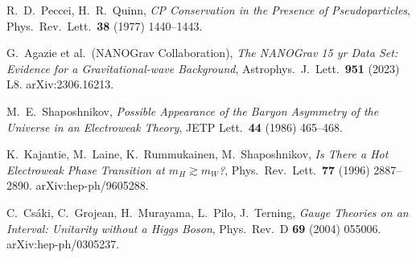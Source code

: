 \documentclass[11pt,a4paper]{article}
\theoremstyle{definition}
\theoremstyle{plain}
\theoremstyle{remark}
\begin{document}
\begin{thebibliography}{99}
R.~D.~Peccei, H.~R.~Quinn, \emph{CP Conservation in the Presence of Pseudoparticles}, Phys.\ Rev.\ Lett.\ \textbf{38} (1977) 1440--1443.

G.~Agazie et al.\ (NANOGrav Collaboration), \emph{The NANOGrav 15 yr Data Set: Evidence for a Gravitational-wave Background}, Astrophys.\ J.\ Lett.\ \textbf{951} (2023) L8. arXiv:2306.16213.

M.~E.~Shaposhnikov, \emph{Possible Appearance of the Baryon Asymmetry of the Universe in an Electroweak Theory}, JETP Lett.\ \textbf{44} (1986) 465--468.

K.~Kajantie, M.~Laine, K.~Rummukainen, M.~Shaposhnikov, \emph{Is There a Hot Electroweak Phase Transition at $m_H \gtrsim m_W$?}, Phys.\ Rev.\ Lett.\ \textbf{77} (1996) 2887--2890. arXiv:hep-ph/9605288.

C.~Cs\'aki, C.~Grojean, H.~Murayama, L.~Pilo, J.~Terning, \emph{Gauge Theories on an Interval: Unitarity without a Higgs Boson}, Phys.\ Rev.\ D \textbf{69} (2004) 055006. arXiv:hep-ph/0305237.

\end{thebibliography}

\end{document}
